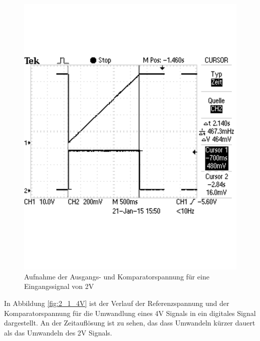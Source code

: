 \documentclass[12pt,a4paper]{article}
\begin{document}
\begin{figure}[H]
  \centering 	
    \includegraphics[trim = 0mm 50mm 0mm 50mm, clip, scale = 0.4]{2_1_2V.pdf}
  	\caption[Aufnahme der Ausgangs- und Komparatorspannung für eine Eingangssignal von 2V]{Aufnahme der Ausgangs- und Komparatorspannung für eine Eingangssignal von 2V} 
  \label{fig:2_1_2V}
\end{figure}

In Abbildung \ref{fig:2_1_4V} ist der Verlauf der Referenzspannung und der Komparatorspannung für die Umwandlung eines 4V Signals in ein digitales Signal dargestellt. An der Zeitauflösung ist zu sehen, das dass Umwandeln kürzer dauert als das Umwandeln des 2V Signals.
\end{document}

